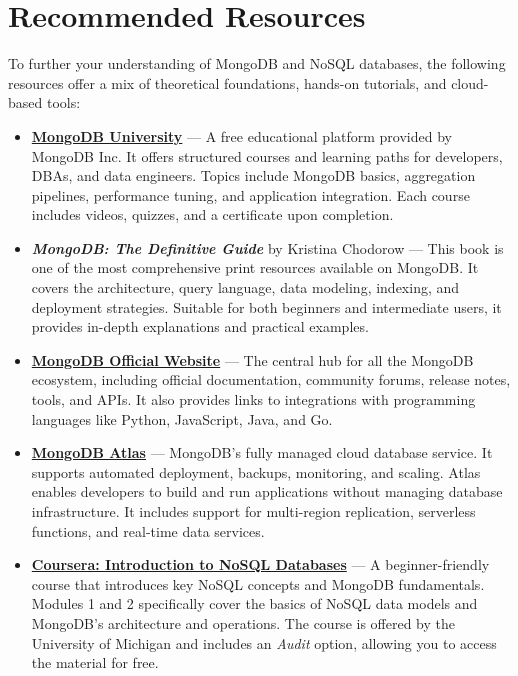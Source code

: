 \documentclass{article}
\begin{document}
\section{Recommended Resources}

To further your understanding of MongoDB and NoSQL databases, the following resources offer a mix of theoretical foundations, hands-on tutorials, and cloud-based tools:

\begin{itemize}
    \item \href{https://university.mongodb.com/}{\textbf{MongoDB University}} — A free educational platform provided by MongoDB Inc. It offers structured courses and learning paths for developers, DBAs, and data engineers. Topics include MongoDB basics, aggregation pipelines, performance tuning, and application integration. Each course includes videos, quizzes, and a certificate upon completion.

    \item \textbf{\textit{MongoDB: The Definitive Guide}} by Kristina Chodorow — This book is one of the most comprehensive print resources available on MongoDB. It covers the architecture, query language, data modeling, indexing, and deployment strategies. Suitable for both beginners and intermediate users, it provides in-depth explanations and practical examples.

    \item \href{https://www.mongodb.com}{\textbf{MongoDB Official Website}} — The central hub for all the MongoDB ecosystem, including official documentation, community forums, release notes, tools, and APIs. It also provides links to integrations with programming languages like Python, JavaScript, Java, and Go.

    \item \href{https://www.mongodb.com/cloud/atlas}{\textbf{MongoDB Atlas}} — MongoDB’s fully managed cloud database service. It supports automated deployment, backups, monitoring, and scaling. Atlas enables developers to build and run applications without managing database infrastructure. It includes support for multi-region replication, serverless functions, and real-time data services.

    \item \href{https://www.coursera.org/learn/introduction-to-nosql-databases/}{\textbf{Coursera: Introduction to NoSQL Databases}} — A beginner-friendly course that introduces key NoSQL concepts and MongoDB fundamentals. Modules 1 and 2 specifically cover the basics of NoSQL data models and MongoDB's architecture and operations. The course is offered by the University of Michigan and includes an \textit{Audit} option, allowing you to access the material for free.
\end{itemize}
\end{document}
